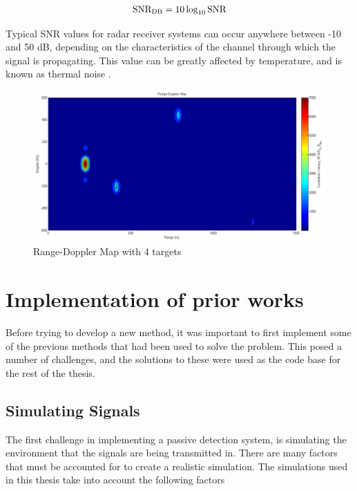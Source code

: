 \documentclass[12pt,openany,a4paper]{book}
\begin{document}
\begin{equation}
\textnormal{SNR}_{\textnormal{DB}} = 10 \log_{10}\textnormal{SNR}
\end{equation}

\bigskip

Typical SNR values for radar receiver systems can occur anywhere between -10 and 50 dB, depending on the characteristics of the channel through which the signal is propagating\cite{SNR}. This value can be greatly affected by temperature, and is known as thermal noise \cite{thermal}.

\begin{figure}[p]
\centering
\includegraphics{RDMAP2.png}
\caption{Range-Doppler Map with 4 targets}
\label{fig:rdm1}
\end{figure}


\cleardoublepage

\chapter{Implementation of prior works}

Before trying to develop a new method, it was important to first implement some of the previous methods that had been used to solve the problem. This posed a number of challenges, and the solutions to these were used as the code base for the rest of the thesis.

\section{Simulating Signals}
The first challenge in implementing a passive detection system, is simulating the environment that the signals are being transmitted in. There are many factors that must be accounted for to create a realistic simulation.
The simulations used in this thesis take into account the following factors
\end{document}
